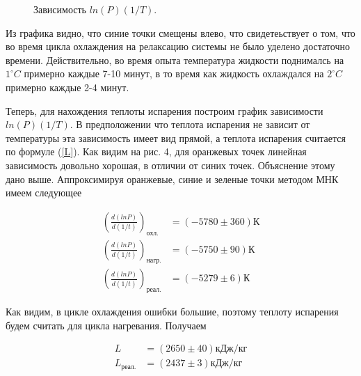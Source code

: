 \documentclass[a4paper, 12pt]{article}
\begin{document}
    \begin{figure}[h]
        \caption{Зависимость $ln(P) (1/T)$.}
        \label{lnP}
    \end{figure}
    Из графика видно, что синие точки смещены влево, что свидетеьствует о том, что во время цикла охлаждения на релаксацию системы не было уделено достаточно времени. Действительно, во время опыта температура жидкости поднималсь на $1 ^\circ C$ примерно каждые 7-10 минут, в то время как жидкость охлаждался на $2 ^\circ C$ примерно каждые 2-4 минут.

    Теперь, для нахождения теплоты испарения построим график зависимости $ln(P) (1/T)$. В предположении что теплота испарения не зависит от температуры эта зависимость имеет вид прямой, а теплота испарения считается по формуле (\ref{L}). Как видим на рис. 4, для оранжевых точек линейная зависимость довольно хорошая, в отличии от синих точек. Объяснение этому дано выше. Аппроксимируя оранжевые, синие и зеленые точки методом МНК имеем следующее

    \begin{align}
        \left(\frac{d(lnP)}{d(1/t)}\right)_{охл.} &= (-5780 \pm 360) К \\
        \left(\frac{d(lnP)}{d(1/t)}\right)_{нагр.} &= (-5750 \pm 90) К\\
        \left(\frac{d(lnP)}{d(1/t)}\right)_{реал.} &= (-5279 \pm 6) К
    \end{align}

    Как видим, в цикле охлаждения ошибки большие, поэтому теплоту испарения будем считать для цикла нагревания. Получаем

    \begin{align}
        L &= (2650 \pm 40)кДж/кг\\
        L_{реал.} &= (2437 \pm 3)кДж/кг
    \end{align}
\end{document}
